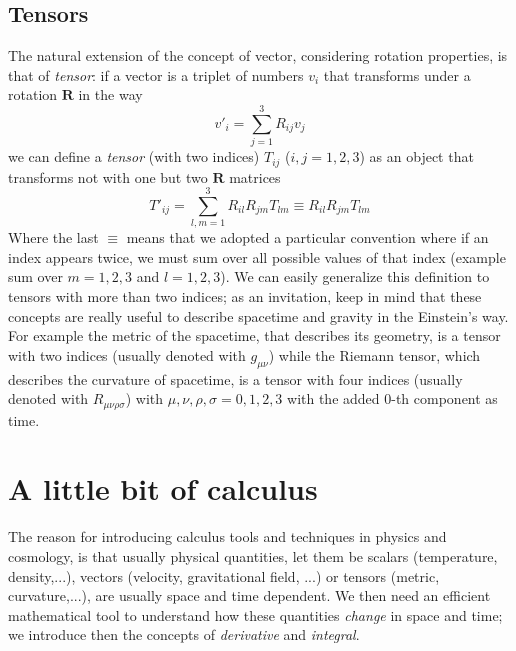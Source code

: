 \subsection{Tensors}
The natural extension of the concept of vector, considering rotation properties, is that of \textit{tensor}: if a vector is a triplet of numbers $v_i$ that transforms under a rotation $\mathbf{R}$ in the way
\begin{equation}
v'_i=\sum_{j=1}^3R_{ij}v_j
\end{equation} 
we can define a \textit{tensor} (with two indices) $T_{ij}$ ($i,j=1,2,3$) as an object that transforms not with one but two $\mathbf{R}$ matrices
\begin{equation}
T'_{ij}=\sum_{l,m=1}^3R_{il}R_{jm}T_{lm}\equiv R_{il}R_{jm}T_{lm}
\end{equation}
Where the last $\equiv$ means that we adopted a particular convention where if an index appears twice, we must sum over all possible values of that index (example sum over $m=1,2,3$ and $l=1,2,3$). We can easily generalize this definition to tensors with more than two indices; as an invitation, keep in mind that these concepts are really useful to describe spacetime and gravity in the Einstein's way. For example the metric of the spacetime, that describes its geometry, is a tensor with two indices (usually denoted with $g_{\mu\nu}$) while the Riemann tensor, which describes the curvature of spacetime, is a tensor with four indices (usually denoted with $R_{\mu\nu\rho\sigma}$) with $\mu,\nu,\rho,\sigma=0,1,2,3$ with the added 0-th component as time. 

\section{A little bit of calculus}
The reason for introducing calculus tools and techniques in physics and cosmology, is that usually physical quantities, let them be scalars (temperature, density,...), vectors (velocity, gravitational field, ...) or tensors (metric, curvature,...), are usually space and time dependent. We then need an efficient mathematical tool to understand how these quantities \textit{change} in space and time; we introduce then the concepts of \textit{derivative} and \textit{integral}. 
